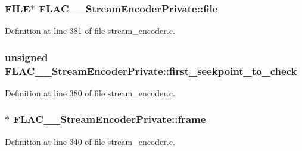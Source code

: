 \subsubsection[{\texorpdfstring{file}{file}}]{\setlength{\rightskip}{0pt plus 5cm}F\+I\+LE$\ast$ F\+L\+A\+C\+\_\+\+\_\+\+Stream\+Encoder\+Private\+::file}\hypertarget{struct_f_l_a_c_____stream_encoder_private_a157f407f03c233ab8f66c870b649798d}{}\label{struct_f_l_a_c_____stream_encoder_private_a157f407f03c233ab8f66c870b649798d}


Definition at line 381 of file stream\+\_\+encoder.\+c.

\subsubsection[{\texorpdfstring{first\+\_\+seekpoint\+\_\+to\+\_\+check}{first_seekpoint_to_check}}]{\setlength{\rightskip}{0pt plus 5cm}unsigned F\+L\+A\+C\+\_\+\+\_\+\+Stream\+Encoder\+Private\+::first\+\_\+seekpoint\+\_\+to\+\_\+check}\hypertarget{struct_f_l_a_c_____stream_encoder_private_a6b1354dc12ac51e43d467cad8a7883c8}{}\label{struct_f_l_a_c_____stream_encoder_private_a6b1354dc12ac51e43d467cad8a7883c8}


Definition at line 380 of file stream\+\_\+encoder.\+c.

\subsubsection[{\texorpdfstring{frame}{frame}}]{$\ast$ F\+L\+A\+C\+\_\+\+\_\+\+Stream\+Encoder\+Private\+::frame}\hypertarget{struct_f_l_a_c_____stream_encoder_private_ab8f4c8c356e31155160278b391e7e35b}{}\label{struct_f_l_a_c_____stream_encoder_private_ab8f4c8c356e31155160278b391e7e35b}


Definition at line 340 of file stream\+\_\+encoder.\+c.

